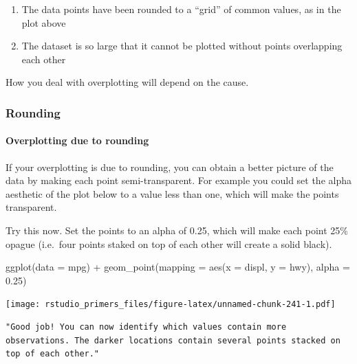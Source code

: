 \documentclass[
]{article}
\newenvironment{Shaded}{\begin{snugshade}}{\end{snugshade}}
\newcommand{\AttributeTok}[1]{\textcolor[rgb]{0.77,0.63,0.00}{#1}}
\newcommand{\FloatTok}[1]{\textcolor[rgb]{0.00,0.00,0.81}{#1}}
\newcommand{\FunctionTok}[1]{\textcolor[rgb]{0.00,0.00,0.00}{#1}}
\newcommand{\NormalTok}[1]{#1}
\newcommand{\SpecialCharTok}[1]{\textcolor[rgb]{0.00,0.00,0.00}{#1}}
\providecommand{\tightlist}{%
  \setlength{\itemsep}{0pt}\setlength{\parskip}{0pt}}
\begin{document}
\begin{enumerate}
\def\labelenumi{\arabic{enumi}.}
\tightlist
\item
  The data points have been rounded to a ``grid'' of common values, as
  in the plot above
\item
  The dataset is so large that it cannot be plotted without points
  overlapping each other
\end{enumerate}

How you deal with overplotting will depend on the cause.

\hypertarget{rounding}{%
\subsubsection{Rounding}\label{rounding}}

\hypertarget{overplotting-due-to-rounding}{%
\paragraph{Overplotting due to
rounding}\label{overplotting-due-to-rounding}}

If your overplotting is due to rounding, you can obtain a better picture
of the data by making each point semi-transparent. For example you could
set the alpha aesthetic of the plot below to a value less than one,
which will make the points transparent.

Try this now. Set the points to an alpha of 0.25, which will make each
point 25\% opague (i.e.~four points staked on top of each other will
create a solid black).

\begin{Shaded}
\begin{Highlighting}[]
\FunctionTok{ggplot}\NormalTok{(}\AttributeTok{data =}\NormalTok{ mpg) }\SpecialCharTok{+}
  \FunctionTok{geom\_point}\NormalTok{(}\AttributeTok{mapping =} \FunctionTok{aes}\NormalTok{(}\AttributeTok{x =}\NormalTok{ displ, }\AttributeTok{y =}\NormalTok{ hwy), }\AttributeTok{alpha =} \FloatTok{0.25}\NormalTok{)}
\end{Highlighting}
\end{Shaded}

\texttt{[image: rstudio\_primers\_files/figure-latex/unnamed-chunk-241-1.pdf]}

\begin{verbatim}
"Good job! You can now identify which values contain more observations. The darker locations contain several points stacked on top of each other."
\end{verbatim}
\end{document}
